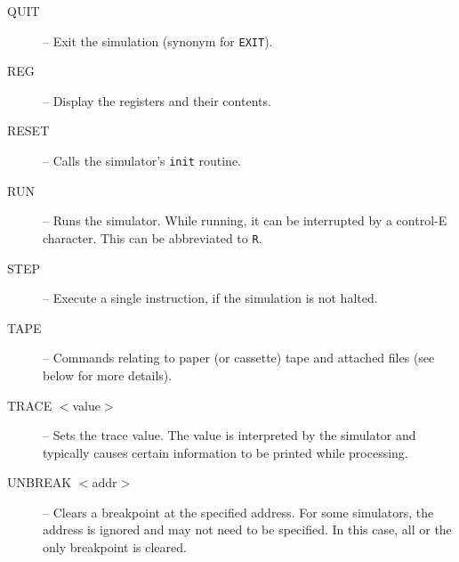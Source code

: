 \documentclass[10pt, openany]{book}
\begin{document}
\begin{description}
  \item[QUIT] -- Exit the simulation (synonym for \verb|EXIT|).
  \item[REG] -- Display the registers and their contents.
  \item[RESET] -- Calls the simulator's \verb|init| routine.
  \item[RUN] -- Runs the simulator.  While running, it can be interrupted by a control-E character.  This can be abbreviated to \verb|R|.
  \item[STEP] -- Execute a single instruction, if the simulation is not halted.
  \item[TAPE] -- Commands relating to paper (or cassette) tape and attached files (see below for more details).
  \item[TRACE $<$value$>$] -- Sets the trace value.  The value is interpreted by the simulator and typically causes certain information to be printed while processing.
  \item[UNBREAK $<$addr$>$] -- Clears a breakpoint at the specified address.  For some simulators, the address is ignored and may not need to be specified.  In this case, all or the only breakpoint is cleared.
\end{description}
\end{document}

